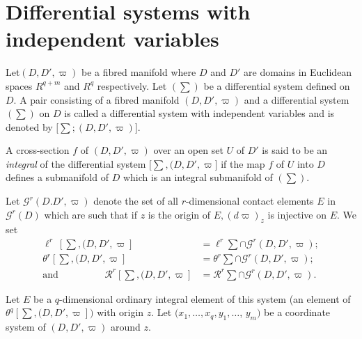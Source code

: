 \section{Differential systems with independent
  variables}\label{chap2:sec2.7} %
 
Let\pageoriginale $(D,  D',  \varpi)$ be a fibred manifold where $D$ and $D'$ are
domains in Euclidean spaces $R^{q+m} $ and $R^q$ respectively. Let
$(\sum)$ be a differential system defined on $D$. A pair consisting of
a fibred manifold $(D,  D',  \varpi)$ and a differential system
$(\sum)$ on $D$ is called a differential system with
  independent variables and is denoted by $\big [ \sum ; (D,  D' ,
  \varpi) \big]$.
 
\begin{defi*}
  A cross-section $f$ of $(D,  D',  \varpi)$ over an open set $U$ of
  $D'$ is said to be an \textit{integral } of the differential system
  $\big [\sum,  (D,  D' ,  \varpi \big]$ if the map $f$ of $U$ into
  $D$ defines a submanifold of $D$ which is an integral submanifold of
  $(\sum)$. 
\end{defi*} 
  
Let $\mathscr{G}^r (D. D',  \varpi)$ denote the set of all
$r$-dimensional contact elements $E$ in $\mathscr{G}^r (D)$ which are
such that if $z$ is the origin of $E,  (d \varpi)_z$ is injective on
$E$. We set  
\begin{align*}
  \ell^r \ \left [\sum,  (D,  D',  \varpi \right ] & = \ell^r \sum
  \cap \mathscr{G}^r (D,  D',  \varpi);\\ 
  \theta^r \left [\sum,  (D,  D',  \varpi \right] & = \theta^r \sum \cap
  \mathscr{G}^r (D,  D',  \varpi);\\ 
  \text{and} \hspace{2cm}\mathscr{R}^r \left[\sum,  (D,  D',  \varpi \right]
  & = \mathscr{R}^r \sum \cap \mathscr{G}^r (D,  D',  \varpi).
\end{align*} 
  
Let $E$ be a $q$-dimensional ordinary integral element of this system
(an element of $\theta^q \left [ \sum,  (D,  D',  \varpi \right
])$ with origin $z$.  Let $(x_1,  \ldots ,  x_q ,  y_1,  \ldots$,
$y_m)$ be a coordinate system of $(D,  D',  \varpi)$ around $z$. 

